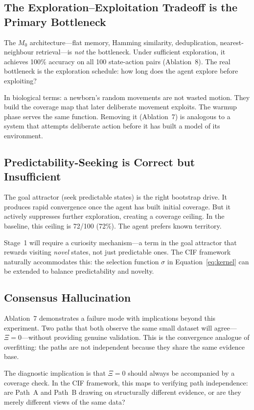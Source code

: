 \documentclass[11pt,a4paper]{article}
\begin{document}
\subsection{The Exploration--Exploitation Tradeoff is the Primary Bottleneck}

The $M_0$ architecture---flat memory, Hamming similarity, dedup\-lication, nearest-neighbour retrieval---is \textit{not} the bottleneck. Under sufficient exploration, it achieves 100\% accuracy on all 100 state-action pairs (Ablation~8). The real bottleneck is the exploration schedule: how long does the agent explore before exploiting?

In biological terms: a newborn's random movements are not wasted motion. They build the coverage map that later deliberate movement exploits. The warmup phase serves the same function. Removing it (Ablation~7) is analogous to a system that attempts deliberate action before it has built a model of its environment.

\subsection{Predictability-Seeking is Correct but Insufficient}

The goal attractor (seek predictable states) is the right bootstrap drive. It produces rapid convergence once the agent has built initial coverage. But it actively suppresses further exploration, creating a coverage ceiling. In the baseline, this ceiling is 72/100 (72\%). The agent prefers known territory.

Stage~1 will require a curiosity mechanism---a term in the goal attractor that rewards visiting \textit{novel} states, not just predictable ones. The CIF framework naturally accommodates this: the selection function $\sigma$ in Equation~\ref{eq:kernel} can be extended to balance predictability and novelty.

\subsection{Consensus Hallucination}

Ablation~7 demonstrates a failure mode with implications beyond this experiment. Two paths that both observe the same small dataset will agree---$\Xi = 0$---without providing genuine validation. This is the convergence analogue of overfitting: the paths are not independent because they share the same evidence base.

The diagnostic implication is that $\Xi = 0$ should always be accompanied by a coverage check. In the CIF framework, this maps to verifying path independence: are Path~A and Path~B drawing on structurally different evidence, or are they merely different views of the same data?
\end{document}
